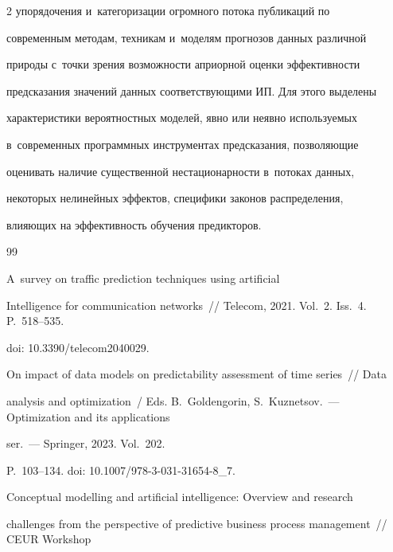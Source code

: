 \begin{multicols}{2}
упорядочения и~категоризации огромного потока публикаций по 


современным методам, техникам и~моделям прогнозов данных различной 


природы с~точки зрения возможности априорной оценки эффективности 


предсказания значений данных соответствующими ИП. Для этого выделены 


характеристики вероятностных моделей, явно или неявно используемых 


в~современных программных инструментах предсказания, позволяющие 


оценивать наличие существенной нестационарности в~потоках данных, 


некоторых нелинейных эффектов, специфики законов распределения, 


влияющих на эффективность обучения предикторов. 


  


  


{\small\frenchspacing


 {\baselineskip=10.5pt




 \begin{thebibliography}{99}




 A~survey on traffic prediction techniques using artificial 


Intelligence for communication networks~// Telecom, 2021. Vol.~2. Iss.~4. P.~518--535.


doi: 10.3390/telecom2040029.




 On impact of data models on predictability assessment of time series~// Data 


analysis and optimization~/ Eds. B.~Goldengorin, S.~Kuznetsov.~--- Optimization and its applications


ser.~--- Springer, 2023. Vol.~202.


P.~103--134.  doi:  10.1007/978-3-031-31654-8\_7.




 Conceptual modelling and artificial intelligence: Overview and research 


challenges from the perspective of predictive business process management~// CEUR Workshop 



\end{thebibliography}}}
\end{multicols}
